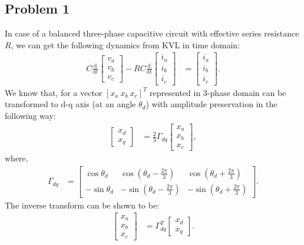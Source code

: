 \subsection*{Problem 1}
In case of a balanced three-phase capacitive circuit with effective series resistance $R$, we can get the following dynamics from KVL in time domain:
\begin{align}\label{eq:q1_dyn_eqn}
	C\frac{\text{d}}{\text{d}t}
	\begin{bmatrix}
		v_a\\v_b\\v_c
	\end{bmatrix}-RC\frac{\text{d}}{\text{d}t}\begin{bmatrix}
		i_a\\i_b\\i_c
	\end{bmatrix} &= \begin{bmatrix}
		i_a\\i_b\\i_c
	\end{bmatrix}.
\end{align}
We know that, for a vector $[x_a\ x_b\ x_c]^T$ represented in $3$-phase domain can be transformed to d-q axis (at an angle $\theta_d$) with amplitude preservation in the following way:
\begin{align*}
\begin{bmatrix}
x_d\\x_q
\end{bmatrix} &= \frac{2}{3}\Gamma_{dq}\begin{bmatrix}
x_a\\x_b\\x_c
\end{bmatrix},
\end{align*}
where,
\begin{align*}
\Gamma_{dq} &= \begin{bmatrix}
\cos \theta_d & \cos (\theta_d - \frac{2\pi}{3}) & \cos (\theta_d + \frac{2\pi}{3})\\
-\sin \theta_d & -\sin (\theta_d - \frac{2\pi}{3}) & -\sin (\theta_d + \frac{2\pi}{3})
\end{bmatrix}.
\end{align*}
The inverse transform can be shown to be:
\begin{align*}
\begin{bmatrix}
x_a\\x_b\\x_c
\end{bmatrix} &= \Gamma_{dq}^T \begin{bmatrix}
x_d\\x_q
\end{bmatrix}.
\end{align*}
